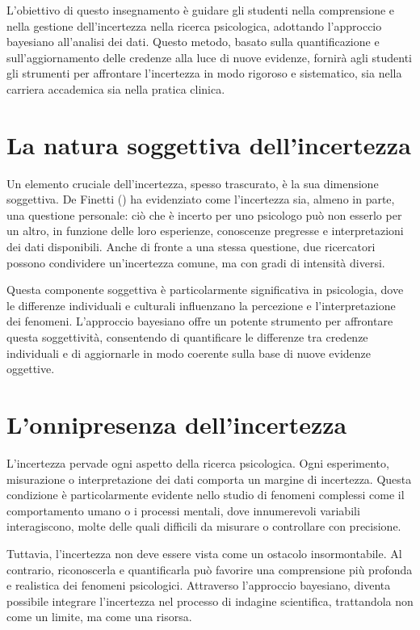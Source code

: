\documentclass[
  letterpaper,
  DIV=11,
  numbers=noendperiod]{scrreprt}
\theoremstyle{definition}
\theoremstyle{remark}
\begin{document}
L'obiettivo di questo insegnamento è guidare gli studenti nella
comprensione e nella gestione dell'incertezza nella ricerca psicologica,
adottando l'approccio bayesiano all'analisi dei dati. Questo metodo,
basato sulla quantificazione e sull'aggiornamento delle credenze alla
luce di nuove evidenze, fornirà agli studenti gli strumenti per
affrontare l'incertezza in modo rigoroso e sistematico, sia nella
carriera accademica sia nella pratica clinica.

\section{La natura soggettiva
dell'incertezza}\label{la-natura-soggettiva-dellincertezza}

Un elemento cruciale dell'incertezza, spesso trascurato, è la sua
dimensione soggettiva. De Finetti
() ha evidenziato come
l'incertezza sia, almeno in parte, una questione personale: ciò che è
incerto per uno psicologo può non esserlo per un altro, in funzione
delle loro esperienze, conoscenze pregresse e interpretazioni dei dati
disponibili. Anche di fronte a una stessa questione, due ricercatori
possono condividere un'incertezza comune, ma con gradi di intensità
diversi.

Questa componente soggettiva è particolarmente significativa in
psicologia, dove le differenze individuali e culturali influenzano la
percezione e l'interpretazione dei fenomeni. L'approccio bayesiano offre
un potente strumento per affrontare questa soggettività, consentendo di
quantificare le differenze tra credenze individuali e di aggiornarle in
modo coerente sulla base di nuove evidenze oggettive.

\section{L'onnipresenza
dell'incertezza}\label{lonnipresenza-dellincertezza}

L'incertezza pervade ogni aspetto della ricerca psicologica. Ogni
esperimento, misurazione o interpretazione dei dati comporta un margine
di incertezza. Questa condizione è particolarmente evidente nello studio
di fenomeni complessi come il comportamento umano o i processi mentali,
dove innumerevoli variabili interagiscono, molte delle quali difficili
da misurare o controllare con precisione.

Tuttavia, l'incertezza non deve essere vista come un ostacolo
insormontabile. Al contrario, riconoscerla e quantificarla può favorire
una comprensione più profonda e realistica dei fenomeni psicologici.
Attraverso l'approccio bayesiano, diventa possibile integrare
l'incertezza nel processo di indagine scientifica, trattandola non come
un limite, ma come una risorsa.
\end{document}
